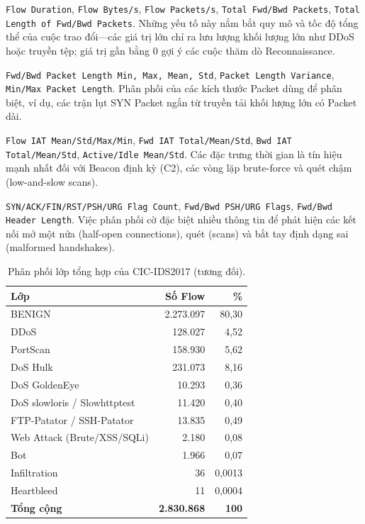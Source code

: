 \begin{description}[leftmargin=1.2em,itemsep=2pt,topsep=2pt]
    \item[Mô tả cấp độ Flow (Flow-level descriptors).] \texttt{Flow Duration}, \texttt{Flow Bytes/s}, \texttt{Flow Packets/s}, \texttt{Total Fwd/Bwd Packets}, \texttt{Total Length of Fwd/Bwd Packets}. Những yếu tố này nắm bắt quy mô và tốc độ tổng thể của cuộc trao đổi---các giá trị lớn chỉ ra lưu lượng khối lượng lớn như DDoS hoặc truyền tệp; giá trị gần bằng 0 gợi ý các cuộc thăm dò Reconnaissance.
    \item[Thống kê kích thước Packet.] \texttt{Fwd/Bwd Packet Length Min, Max, Mean, Std}, \texttt{Packet Length Variance}, \texttt{Min/Max Packet Length}. Phân phối của các kích thước Packet dùng để phân biệt, ví dụ, các trận lụt SYN Packet ngắn từ truyền tải khối lượng lớn có Packet dài.
    \item[Thời gian xuất hiện (Inter-arrival times - IAT).] \texttt{Flow IAT Mean/Std/Max/Min}, \texttt{Fwd IAT Total/Mean/Std}, \texttt{Bwd IAT Total/Mean/Std}, \texttt{Active/Idle Mean/Std}. Các đặc trưng thời gian là tín hiệu mạnh nhất đối với Beacon định kỳ (C2), các vòng lặp brute-force và quét chậm (low-and-slow scans).
    \item[Số lượng cờ TCP và tiêu đề.] \texttt{SYN/ACK/FIN/RST/PSH/URG Flag Count}, \texttt{Fwd/Bwd PSH/URG Flags}, \texttt{Fwd/Bwd Header Length}. Việc phân phối cờ đặc biệt nhiều thông tin để phát hiện các kết nối mở một nửa (half-open connections), quét (scans) và bắt tay định dạng sai (malformed handshakes).
\end{description}

\begin{table}[h]
\centering
\caption{Phân phối lớp tổng hợp của CIC-IDS2017 (tương đối).}
\label{tab:class-dist}
\begin{tabular}{lrr}
\toprule
\textbf{Lớp} & \textbf{Số Flow} & \textbf{\%}  \\
\midrule
BENIGN                     & 2.273.097 & 80,30  \\
DDoS                       &   128.027 &  4,52  \\
PortScan                   &   158.930 &  5,62  \\
DoS Hulk                   &   231.073 &  8,16  \\
DoS GoldenEye              &    10.293 &  0,36  \\
DoS slowloris / Slowhttptest &  11.420 &  0,40  \\
FTP-Patator / SSH-Patator   &    13.835 &  0,49  \\
Web Attack (Brute/XSS/SQLi) &     2.180 &  0,08  \\
Bot                         &     1.966 &  0,07  \\
Infiltration                &        36 &  0,0013  \\
Heartbleed                  &        11 &  0,0004  \\
\midrule
\textbf{Tổng cộng}          & \textbf{2.830.868} & \textbf{100}  \\
\bottomrule
\end{tabular}
\end{table}

